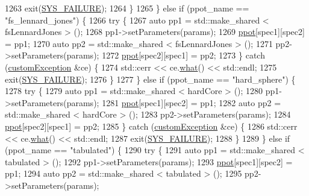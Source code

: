 \begin{DoxyCode}
1263             exit(\hyperlink{global_8h_a428dfe1ef0a6ff4b1fdebf275f6aff2e}{SYS\_FAILURE});
1264         \}
1265     \} \textcolor{keywordflow}{else} \textcolor{keywordflow}{if} (ppot\_name == \textcolor{stringliteral}{"fs\_lennard\_jones"}) \{
1266         \textcolor{keywordflow}{try} \{
1267             \textcolor{keyword}{auto} pp1 = std::make\_shared < fsLennardJones > ();
1268             pp1->setParameters(params);
1269             \hyperlink{classsim_system_ad2e290b5963f132e6a3a56cee35c8e9f}{ppot}[spec1][spec2] = pp1;
1270             \textcolor{keyword}{auto} pp2 = std::make\_shared < fsLennardJones > ();
1271             pp2->setParameters(params);
1272             \hyperlink{classsim_system_ad2e290b5963f132e6a3a56cee35c8e9f}{ppot}[spec2][spec1] = pp2;
1273         \} \textcolor{keywordflow}{catch} (\hyperlink{classcustom_exception}{customException} &ce) \{
1274             std::cerr << ce.\hyperlink{classcustom_exception_aeb6ab5848b038adfc68fde86a512f691}{what}() << std::endl;
1275             exit(\hyperlink{global_8h_a428dfe1ef0a6ff4b1fdebf275f6aff2e}{SYS\_FAILURE});
1276         \}
1277     \} \textcolor{keywordflow}{else} \textcolor{keywordflow}{if} (ppot\_name == \textcolor{stringliteral}{"hard\_sphere"}) \{
1278         \textcolor{keywordflow}{try} \{
1279             \textcolor{keyword}{auto} pp1 = std::make\_shared < hardCore > ();
1280             pp1->setParameters(params);
1281             \hyperlink{classsim_system_ad2e290b5963f132e6a3a56cee35c8e9f}{ppot}[spec1][spec2] = pp1;
1282             \textcolor{keyword}{auto} pp2 = std::make\_shared < hardCore > ();
1283             pp2->setParameters(params);
1284             \hyperlink{classsim_system_ad2e290b5963f132e6a3a56cee35c8e9f}{ppot}[spec2][spec1] = pp2;
1285         \} \textcolor{keywordflow}{catch} (\hyperlink{classcustom_exception}{customException} &ce) \{
1286             std::cerr << ce.\hyperlink{classcustom_exception_aeb6ab5848b038adfc68fde86a512f691}{what}() << std::endl;
1287             exit(\hyperlink{global_8h_a428dfe1ef0a6ff4b1fdebf275f6aff2e}{SYS\_FAILURE});
1288         \}
1289     \} \textcolor{keywordflow}{else} \textcolor{keywordflow}{if} (ppot\_name == \textcolor{stringliteral}{"tabulated"}) \{
1290         \textcolor{keywordflow}{try} \{
1291             \textcolor{keyword}{auto} pp1 = std::make\_shared < tabulated > ();
1292             pp1->setParameters(params);
1293             \hyperlink{classsim_system_ad2e290b5963f132e6a3a56cee35c8e9f}{ppot}[spec1][spec2] = pp1;
1294             \textcolor{keyword}{auto} pp2 = std::make\_shared < tabulated > ();
1295             pp2->setParameters(params);

\end{DoxyCode}
